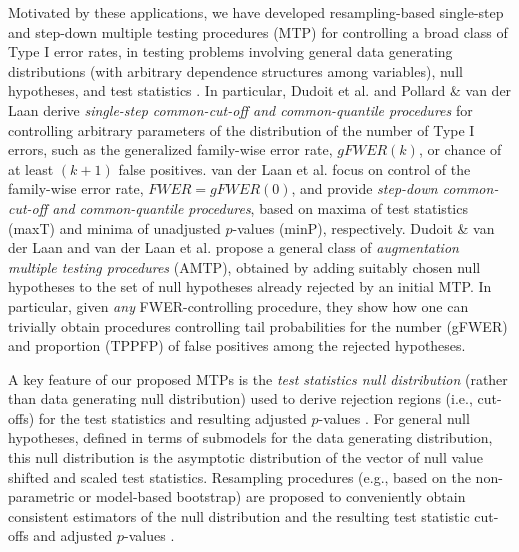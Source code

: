 \documentclass[11pt]{article}
\begin{document}
Motivated by these applications, we have developed resampling-based single-step and step-down multiple testing procedures (MTP) for controlling a broad class of Type I error rates, in testing problems involving general data generating distributions (with arbitrary dependence structures among variables), null hypotheses, and test statistics \cite{Dudoit&vdLaanMTBook,DudoitetalMT1SAGMB04,vdLaanetalMT2SAGMB04,vdLaanetalMT3SAGMB04,Pollard&vdLaanJSPI04}. 
In particular, Dudoit et al. \cite{DudoitetalMT1SAGMB04} and Pollard \& van der Laan \cite{Pollard&vdLaanJSPI04} derive
{\em single-step common-cut-off and common-quantile procedures} for controlling arbitrary parameters of the distribution of the number of Type I errors, such as the generalized family-wise error rate, $gFWER(k)$, or chance of at least $(k+1)$ false positives. 
van der Laan et al. \cite{vdLaanetalMT2SAGMB04} focus on control of the family-wise error rate, $FWER = gFWER(0)$, and provide {\em step-down common-cut-off and common-quantile procedures}, based on maxima of test statistics (maxT) and minima of unadjusted $p$-values (minP), respectively. 
Dudoit \& van der Laan \cite{Dudoit&vdLaanMTBook} and van der Laan et al. \cite{vdLaanetalMT3SAGMB04} propose a general class of {\em augmentation multiple testing procedures} (AMTP), obtained by adding suitably chosen null hypotheses to the set of null hypotheses already rejected by an initial MTP. In particular, given {\em any} FWER-controlling procedure, they show how one can trivially obtain 
procedures controlling tail probabilities for the number (gFWER) and proportion (TPPFP) of false positives among the rejected hypotheses.
 
A key feature of our proposed MTPs is the {\em test statistics null distribution} (rather than data generating null distribution) used to derive rejection regions (i.e., cut-offs) for the test statistics and resulting adjusted $p$-values \cite{Dudoit&vdLaanMTBook,DudoitetalMT1SAGMB04,vdLaanetalMT2SAGMB04,vdLaanetalMT3SAGMB04,Pollard&vdLaanJSPI04}. 
For general null hypotheses, defined in terms of submodels for the data generating distribution, this null distribution is the asymptotic distribution of the vector of null value shifted and scaled test statistics. 
Resampling procedures (e.g., based on the non-parametric or model-based bootstrap) are proposed to conveniently obtain consistent estimators of the null distribution and the resulting test statistic cut-offs and adjusted $p$-values \cite{DudoitetalMT1SAGMB04,vdLaanetalMT2SAGMB04,Pollard&vdLaanJSPI04}.
\end{document}
